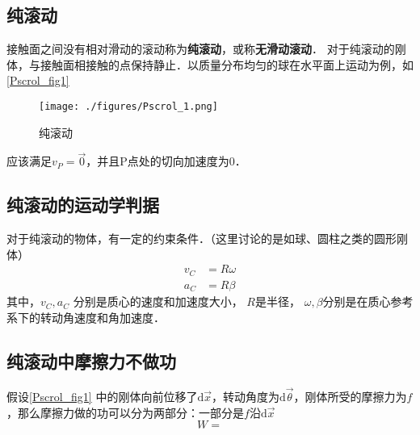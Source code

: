 


\subsection{纯滚动}
接触面之间没有相对滑动的滚动称为\textbf{纯滚动}，或称\textbf{无滑动滚动}．
对于纯滚动的刚体，与接触面相接触的点保持静止．以质量分布均匀的球在水平面上运动为例，如\autoref{Pscrol_fig1}
\begin{figure}[ht]
\centering
\texttt{[image: ./figures/Pscrol\_1.png]}
\caption{纯滚动} \label{Pscrol_fig1}
\end{figure}
应该满足$v_P=\vec 0$，并且P点处的切向加速度为0．

\subsection{纯滚动的运动学判据}
对于纯滚动的物体，有一定的约束条件．（这里讨论的是如球、圆柱之类的圆形刚体）
\begin{align}
v_C&=R\omega\\
a_C&=R\beta
\end{align}
其中，$v_C,a_C$
分别是质心的速度和加速度大小，
$R$是半径，
$\omega,\beta$分别是在质心参考系下的转动角速度和角加速度．

\subsection{纯滚动中摩擦力不做功}
假设\autoref{Pscrol_fig1} 中的刚体向前位移了$\mathrm{d}\vec x$，转动角度为$\mathrm{d} \vec \theta$，刚体所受的摩擦力为$f$，那么摩擦力做的功可以分为两部分：一部分是$f$沿$\mathrm{d} \vec x$ 
\begin{equation}
W=
\end{equation}
